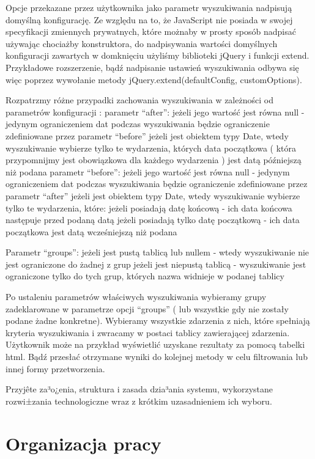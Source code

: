\documentclass[polish,12pt]{aghthesis}
\begin{document}
{Opcje przekazane przez użytkownika jako parametr wyszukiwania nadpisują domyślną konfigurację.
Ze względu na to, że JavaScript nie posiada w swojej specyfikacji zmiennych prywatnych, które  możnaby w prosty sposób nadpisać używając chociażby konstruktora, do nadpisywania wartości domyślnych konfiguracji zawartych w domknięciu użyliśmy biblioteki jQuery i funkcji extend. Przykładowe rozszerzenie, bądź nadpisanie ustawień wyszukiwania odbywa się więc poprzez wywołanie metody jQuery.extend(defaultConfig, customOptions).

Rozpatrzmy różne przypadki zachowania wyszukiwania w zależności od parametrów konfiguracji :
parametr “after”:
jeżeli jego wartość jest równa null - jedynym ograniczeniem dat podczas wyszukiwania będzie ograniczenie zdefiniowane przez parametr “before”
jeżeli jest obiektem typy Date, wtedy wyszukiwanie wybierze tylko te wydarzenia, których data początkowa ( która przypomnijmy jest obowiązkowa dla każdego wydarzenia ) jest datą późniejszą niż podana
parametr “before”:
jeżeli jego wartość jest równa null - jedynym ograniczeniem dat podczas wyszukiwania będzie ograniczenie zdefiniowane przez parametr “after”
jeżeli jest obiektem typy Date, wtedy wyszukiwanie wybierze tylko te wydarzenia, które:
 jeżeli posiadają datę końcową - ich data końcowa następuje przed podaną datą
jeżeli posiadają tylko datę początkową - ich data początkowa jest datą wcześniejszą niż podana

Parametr “groups”:
jeżeli jest pustą tablicą lub nullem - wtedy wyszukiwanie nie jest ograniczone do żadnej z grup
jeżeli jest niepustą tablicą - wyszukiwanie jest ograniczone tylko do tych grup, których nazwa widnieje w podanej tablicy

Po ustaleniu parametrów właściwych wyszukiwania wybieramy grupy zadeklarowane w parametrze opcji “groups” ( lub wszystkie gdy nie zostały podane żadne konkretne). Wybieramy wszystkie zdarzenia z nich, które spełniają kryteria wyszukiwania i zwracamy w postaci tablicy zawierającej zdarzenia.
Użytkownik może na przykład wyświetlić uzyskane rezultaty za pomocą tabelki html. Bądź przesłać otrzymane wyniki do kolejnej metody w celu filtrowania lub innej formy przetworzenia.


Przyjête za³o¿enia, struktura i zasada dzia³ania systemu,
  wykorzystane rozwi±zania technologiczne wraz z krótkim uzasadnieniem
  ich wyboru.}

\section{Organizacja pracy}
\label{sec:organizacja-pracy}
\end{document}
